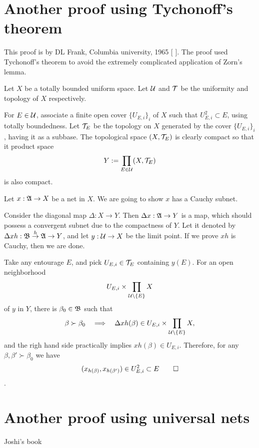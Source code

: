 \documentclass{../exp}
\begin{document}
\section{Another proof using Tychonoff's theorem}
This proof is by DL Frank, Columbia university, 1965 [ ].
The proof used Tychonoff's theorem to avoid the extremely complicated application of Zorn's lemma.

\begin{pf}[2 of Theorem 1.1]
Let $X$ be a totally bounded uniform space.
Let $\mathcal{U}$ and $\mathcal{T}$ be the uniformity and topology of $X$ respectively.

For $E\in\mathcal{U}$, associate a finite open cover $\{U_{E,i}\}_i$ of $X$ such that $U_{E,i}^2\subset E$, using totally boundedness.
Let $\mathcal{T}_E$ be the topology on $X$ generated by the cover $\{U_{E,i}\}_i$, having it as a subbase.
The topological space $(X,\mathcal{T}_E)$ is clearly compact so that it product space
\[Y:=\prod_{E\in\mathcal{U}}(X,\mathcal{T}_E)\]
is also compact.

Let $x:\fA\to X$ be a net in $X$.
We are going to show $x$ has a Cauchy subnet.

Consider the diagonal map $\Delta:X\to Y$.
Then $\Delta x:\fA\to Y$ is a map, which should possess a convergent subnet due to the compactness of $Y$.
Let it denoted by $\Delta xh:\fB\to{h}\fA\to Y$, and let $y:\cU\to X$ be the limit point.
If we prove $xh$ is Cauchy, then we are done.

Take any entourage $E$, and pick $U_{E,i}\in\mathcal{T}_E$ containing $y(E)$.
For an open neighborhood
\[U_{E,i}\times\prod_{\mathcal{U}\setminus\{E\}}X\]
of $y$ in $Y$, there is $\beta_0\in\mathfrak{B}$ such that
\[\beta\succ\beta_0\impl\Delta xh(\beta)\in U_{E,i}\x\prod_{\cU\setminus\{E\}}X,\]
and the righ hand side practically implies $xh(\beta)\in U_{E,i}$.
Therefore, for any $\beta,\beta'\succ\beta_0$ we have
\[(x_{h(\beta)},x_{h(\beta')})\in U_{E,i}^2\subset E\qedhere\].
\end{pf}


\section{Another proof using universal nets}
Joshi's book
\end{document}
